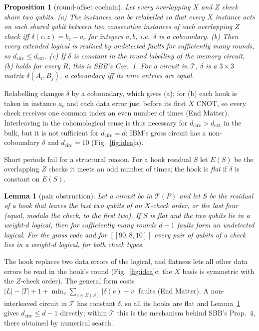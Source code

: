 \documentclass[aps,prl,twocolumn,superscriptaddress,nofootinbib]{revtex4-2}
\newcommand{\dcirc}{d_{\mathrm{circ}}}
\newcommand{\dext}{d_{\mathrm{ext}}}
\newcommand{\code}[1]{[[#1]]}
\newcommand{\T}{\mathcal{T}}
\newtheorem{proposition}[theorem]{Proposition}
\newtheorem{lemma}[theorem]{Lemma}
\begin{document}
\begin{proposition}[round-offset cochain]\label{prop:delta}
Let every overlapping $X$ and $Z$ check share two qubits. (a) The instances can be
relabelled so that every $X$ instance acts on each shared qubit between two consecutive
instances of each overlapping $Z$ check iff $\delta(c,z)=b_z-a_c$ for integers $a,b$,
i.e.\ $\delta$ is a coboundary. (b) Then every extended logical is realised by undetected
faults for sufficiently many rounds, so $\dcirc\le\dext$. (c) If $\delta$ is constant in the round
labelling of the memory circuit, (b) holds for every $R$; this is SBB's Cor.~1. For a circuit in $\T$, $\delta$ is a $3\times3$
matrix $\delta(A_i,B_j)$, a coboundary iff its nine entries are equal.
\end{proposition}
\noindent Relabelling changes $\delta$ by a coboundary, which gives (a); for (b) each
hook is taken in instance $a_c$ and each data error just before its first $X$ CNOT, so
every check receives one common index an even number of times (End Matter).
Interleaving in the cohomological sense is thus necessary for $\dcirc>\dext$ in the bulk, but it is
not sufficient for $\dcirc=d$: IBM's gross circuit has a non-coboundary $\delta$ and
$\dcirc=10$ (Fig.~\ref{fig:idea}a).

Short periods fail for a structural reason. For a hook residual $S$ let $E(S)$ be the
overlapping $Z$ checks it meets an odd number of times; the hook is \emph{flat} if
$\delta$ is constant on $E(S)$.
\begin{lemma}[pair obstruction]\label{lem:pair}
Let a circuit be in $\T(P)$ and let $S$ be the residual of a hook that leaves the last two
qubits of an $X$-check order, or the last four (equal, modulo the check, to the first two).
If $S$ is flat and the two qubits lie in a weight-$d$ logical, then for sufficiently many
rounds $d-1$ faults form an undetected logical. For the gross code and for $\code{90,8,10}$
every pair of qubits of a check lies in a weight-$d$ logical, for both check types.
\end{lemma}
\noindent The hook replaces two data errors of the logical, and flatness lets all other
data errors be read in the hook's round (Fig.~\ref{fig:idea}c; the $X$ basis is symmetric
with the $Z$-check order). The general form costs $|L|-|T|+1+\min_v\sum_{e\in E(S)}
|\delta(e)-v|$ faults (End Matter). A non-interleaved circuit in $\T$ has constant
$\delta$, so all its hooks are flat and Lemma~\ref{lem:pair} gives $\dcirc\le d-1$
directly; within $\T$ this is the mechanism behind SBB's Prop.~4, there obtained by
numerical search.
\end{document}
